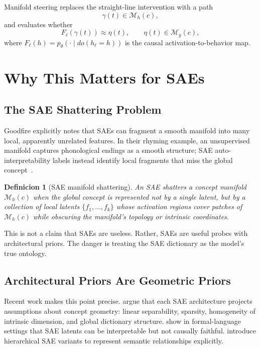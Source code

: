 \documentclass[11pt,a4paper]{article}
\newtheorem{definition}{Definicion}
\newcommand{\Mh}{\mathcal{M}_h}
\newcommand{\My}{\mathcal{M}_y}
\begin{document}
Manifold steering replaces the straight-line intervention with a path
\[
  \gamma(t) \in \Mh(c),
\]
and evaluates whether
\[
  F_\ell(\gamma(t)) \approx \eta(t), \qquad \eta(t) \in \My(c),
\]
where $F_\ell(h)=p_\theta(\cdot \mid do(h_\ell=h))$ is the causal activation-to-behavior map.

\section{Why This Matters for SAEs}
\label{sec:sae}

\subsection{The SAE Shattering Problem}

Goodfire explicitly notes that SAEs can fragment a smooth manifold into many local, apparently unrelated features. In their rhyming example, an unsupervised manifold captures phonological endings as a smooth structure; SAE auto-interpretability labels instead identify local fragments that miss the global concept~\citep{geiger2026worldinside}.

\begin{definition}[SAE manifold shattering]
An SAE shatters a concept manifold $\Mh(c)$ when the global concept is represented not by a single latent, but by a collection of local latents $\{f_1,\ldots,f_k\}$ whose activation regions cover patches of $\Mh(c)$ while obscuring the manifold's topology or intrinsic coordinates.
\end{definition}

This is not a claim that SAEs are useless. Rather, SAEs are useful probes with architectural priors. The danger is treating the SAE dictionary as the model's true ontology.

\subsection{Architectural Priors Are Geometric Priors}

Recent work makes this point precise. \citet{hindupur2025projecting} argue that each SAE architecture projects assumptions about concept geometry: linear separability, sparsity, homogeneity of intrinsic dimension, and global dictionary structure. \citet{menon2024formal} show in formal-language settings that SAE latents can be interpretable but not causally faithful. \citet{muchane2025hierarchical} introduce hierarchical SAE variants to represent semantic relationships explicitly.
\end{document}
